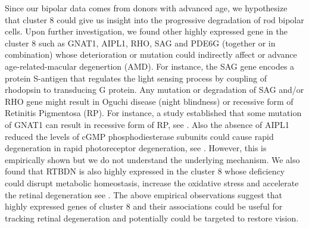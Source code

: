 \documentclass[11pt]{article}
\begin{document}
Since our bipolar data comes from donors with advanced age, we hypothesize that cluster $8$ could give us insight into the progressive degradation of rod bipolar cells. Upon further investigation, we found other highly expressed gene in the cluster $8$ such as GNAT1, AIPL1, RHO, SAG and PDE6G (together or in combination) whose deterioration or mutation could indirectly affect or advance age-related-macular degenertion (AMD). For instance, the SAG gene encodes a protein S-antigen that regulates the light sensing process by coupling of rhodopsin to transducing G protein. Any mutation or degradation of SAG and/or RHO gene might result in Oguchi disease (night blindness) or recessive form of Retinitis Pigmentosa (RP). For instance, a study established that some mutation of GNAT1 can result in recessive form of RP, see \cite{GNAT1}. Also the absence of AIPL1 reduced the levels of cGMP phosphodiesterase subunits could cause rapid degeneration in rapid photoreceptor degeneration, see \cite{AIPL1}. However, this is empirically shown but we do not understand the underlying mechanism. We also found that RTBDN is also highly expressed in the cluster $8$ whose deficiency could disrupt metabolic homeostasis, increase the oxidative stress and accelerate the retinal degeneration see \cite{RTBDN}. The above empirical observations suggest that highly expressed genes of cluster 8 and their associations could be useful for tracking retinal degeneration and potentially could be targeted to restore vision.

\end{document}
